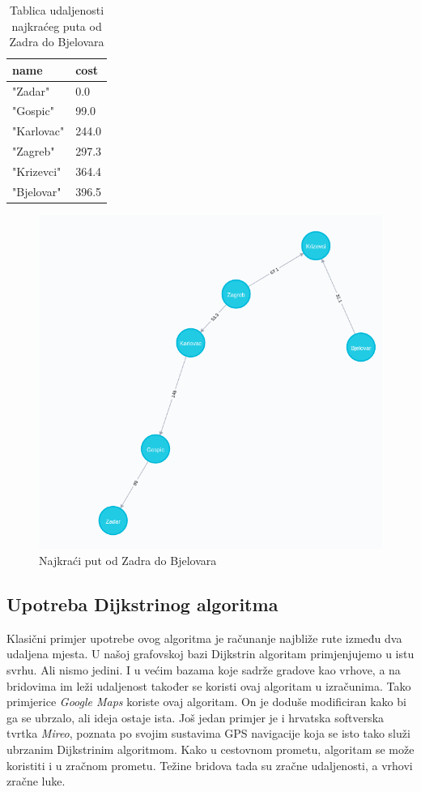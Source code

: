 \documentclass[10pt]{scrartcl}
\begin{document}
\begin{table}[H]
\centering
\caption{Tablica udaljenosti najkraćeg puta od Zadra do Bjelovara}
\begin{tabular}{|l|l|}
\hline
\textbf{name} & \textbf{cost} \\ \hline
"Zadar"       & 0.0           \\ \hline
"Gospic"      & 99.0          \\ \hline
"Karlovac"    & 244.0         \\ \hline
"Zagreb"      & 297.3         \\ \hline
"Krizevci"    & 364.4         \\ \hline
"Bjelovar"    & 396.5         \\ \hline
\end{tabular}
\end{table}

\begin{figure}[H]
    \centering
    \includegraphics[scale=0.3]{zd-bjelovar}
    \caption{Najkraći put od Zadra do Bjelovara}
\end{figure}

\subsection{Upotreba Dijkstrinog algoritma}
Klasični primjer upotrebe ovog algoritma je računanje najbliže rute između dva udaljena mjesta.
U našoj grafovskoj bazi Dijkstrin algoritam primjenjujemo u istu svrhu. Ali nismo jedini. I u većim bazama koje sadrže gradove kao vrhove, a na bridovima im leži udaljenost također se koristi ovaj algoritam u izračunima. Tako primjerice \emph{Google Maps} koriste ovaj algoritam. On je doduše modificiran kako bi ga se ubrzalo, ali ideja ostaje ista. Još jedan primjer je i hrvatska softverska tvrtka \emph{Mireo}, poznata po svojim sustavima GPS navigacije koja se isto tako služi ubrzanim Dijkstrinim algoritmom. 
Kako u cestovnom prometu, algoritam se može koristiti i u zračnom prometu. Težine bridova tada su zračne udaljenosti, a vrhovi zračne luke.
\end{document}
